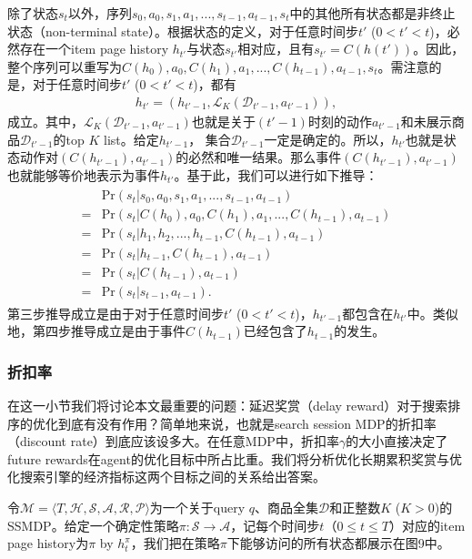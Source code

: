 除了状态$s_t$以外，序列$s_0, a_0, s_1, a_1, ..., s_{t-1}, a_{t-1}, s_t$中的其他所有状态都是非终止状态（non-terminal state）。根据状态的定义，对于任意时间步$t'$ ($0 < t' < t$)，必然存在一个item page history $h_{t'}$与状态$s_{t'}$相对应，且有$s_{t'} = C(h(t'))$。因此，整个序列可以重写为$C(h_0), a_0, C(h_1), a_1, ..., C(h_{t-1}), a_{t-1}, s_t$。需注意的是，对于任意时间步$t'$ ($0 < t' < t$)，都有
\begin{align}
h_{t'} = (h_{t' - 1}, \mathcal{L}_K(\mathcal{D}_{t'-1}, a_{t'-1})),
\end{align}
成立。其中，$\mathcal{L}_K(\mathcal{D}_{t'-1}, a_{t'-1})$也就是关于$(t'-1)$时刻的动作$a_{t'-1}$和未展示商品$\mathcal{D}_{t'-1}$的top $K$ list。给定$h_{t'-1}$， 集合$\mathcal{D}_{t'-1}$一定是确定的。所以，$h_{t'}$也就是状态动作对$(C(h_{t'-1}), a_{t'-1})$的必然和唯一结果。那么事件$(C(h_{t'-1}), a_{t'-1})$也就能够等价地表示为事件$h_{t'}$。基于此，我们可以进行如下推导：
\begin{align}
\begin{split}
&\text{Pr}(s_t | s_0, a_0, s_1, a_1, ..., s_{t-1}, a_{t-1}) \\
= &\text{Pr}(s_t | C(h_0), a_0, C(h_1), a_1, ..., C(h_{t-1}), a_{t-1}) \\
= &\text{Pr}(s_t | h_1, h_2, ..., h_{t-1}, C(h_{t-1}), a_{t-1}) \\
= &\text{Pr}(s_t | h_{t-1}, C(h_{t-1}), a_{t-1}) \\
= &\text{Pr}(s_t | C(h_{t-1}), a_{t-1}) \\
= &\text{Pr}(s_t | s_{t-1}, a_{t-1}).
\end{split}
\end{align}
 第三步推导成立是由于对于任意时间步$t'$ ($0 < t' < t$)，$h_{t'-1}$都包含在$h_{t'}$中。类似地，第四步推导成立是由于事件$C(h_{t-1})$已经包含了$h_{t-1}$的发生。

\subsubsection{折扣率}
在这一小节我们将讨论本文最重要的问题：延迟奖赏（delay reward）对于搜索排序的优化到底有没有作用？简单地来说，也就是search session MDP的折扣率（discount rate）到底应该设多大。在任意MDP中，折扣率$\gamma$的大小直接决定了future rewards在agent的优化目标中所占比重。我们将分析优化长期累积奖赏与优化搜索引擎的经济指标这两个目标之间的关系给出答案。

令$\mathcal{M} = \langle T, \mathcal{H}, \mathcal{S}, \mathcal{A}, \mathcal{R}, \mathcal{P} \rangle$为一个关于query $q$、商品全集$\mathcal{D}$和正整数$K$ ($K > 0$)的SSMDP。给定一个确定性策略$\pi : \mathcal{S} \rightarrow \mathcal{A}$，记每个时间步$t$（$0 \leq t \leq T$）对应的item page history为$\pi$ by $h^{\pi}_t$，我们把在策略$\pi$下能够访问的所有状态都展示在图9中。


